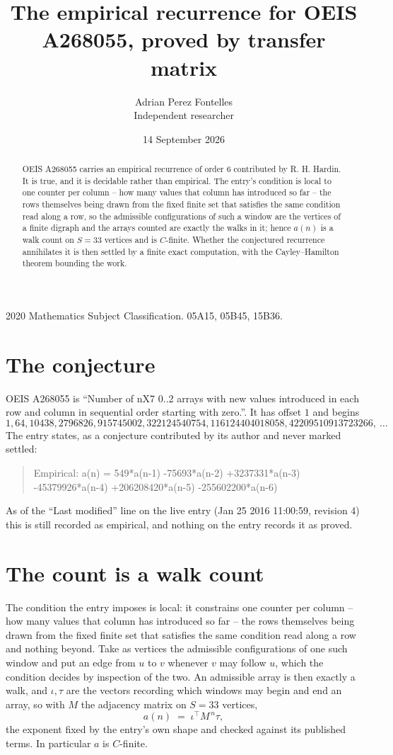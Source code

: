 \documentclass[11pt,a4paper]{article}
\title{The empirical recurrence for OEIS A268055, proved by transfer matrix}
\author{Adrian Perez Fontelles\\ \small Independent researcher}
\date{14 September 2026}
\theoremstyle{plain}
\theoremstyle{definition}
\begin{document}
\maketitle

\begin{abstract}
OEIS A268055 carries an empirical recurrence of order $6$ contributed by R. H. Hardin. It is
true, and it is decidable rather than empirical. The entry's condition is local to one counter per column -- how many values that column has introduced so far -- the rows themselves being drawn from the fixed finite set that satisfies the same condition read along a row, so
the admissible configurations of such a window are the vertices of a finite digraph and the
arrays counted are exactly the walks in it; hence $a(n)$ is a walk count on $S=33$ vertices
and is $C$-finite. Whether the conjectured recurrence annihilates it is then settled by a
finite exact computation, with the Cayley--Hamilton theorem bounding the work.
\end{abstract}

\noindent\small 2020 Mathematics Subject Classification. 05A15, 05B45, 15B36.\normalsize

\section{The conjecture}

OEIS A268055 is ``Number of nX7 0..2 arrays with new values introduced in each row and column in sequential order starting with zero.''. It has offset $1$ and begins
\[
1, 64, 10438, 2796826, 915745002, 322124540754, 116124404018058, 42209510913723266,\ \dots
\]
The entry states, as a conjecture contributed by its author and never marked settled:
\begin{quote}
Empirical: a(n) = 549*a(n-1) -75693*a(n-2) +3237331*a(n-3) -45379926*a(n-4) +206208420*a(n-5) -255602200*a(n-6)
\end{quote}
As of the ``Last modified'' line on the live entry (Jan 25 2016 11:00:59, revision 4) this is still
recorded as empirical, and nothing on the entry records it as proved.

\section{The count is a walk count}

The condition the entry imposes is local: it constrains one counter per column -- how many values that column has introduced so far -- the rows themselves being drawn from the fixed finite set that satisfies the same condition read along a row and nothing beyond. Take as vertices the admissible configurations of one such window and put an edge from $u$ to $v$ whenever $v$ may follow $u$, which the condition decides by inspection of the two.
An admissible array is then exactly a walk, and $\iota,\tau$ are the vectors recording which windows may begin and end an array, so with $M$ the adjacency matrix on $S=33$ vertices,
\[
a(n)\;=\;\iota^{\!\top}M^{\,n}\tau ,
\]
the exponent fixed by the entry's own shape and checked against its published terms. In
particular $a$ is $C$-finite.
\end{document}
